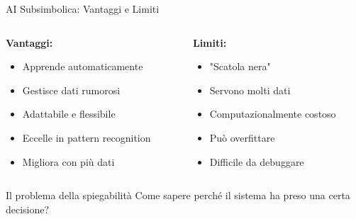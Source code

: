 \documentclass[aspectratio=169,12pt]{beamer}
\begin{document}
%
%
\begin{frame}{AI Subsimbolica: Vantaggi e Limiti}
    \begin{columns}
        \begin{column}{0.5\textwidth}
            \textbf{Vantaggi:}
            \begin{itemize}
                \item Apprende automaticamente
                \item Gestisce dati rumorosi
                \item Adattabile e flessibile
                \item Eccelle in pattern recognition
                \item Migliora con più dati
            \end{itemize}
        \end{column}
        \begin{column}{0.5\textwidth}
            \textbf{Limiti:}
            \begin{itemize}
                \item "Scatola nera"
                \item Servono molti dati
                \item Computazionalmente costoso
                \item Può overfittare
                \item Difficile da debuggare
            \end{itemize}
        \end{column}
    \end{columns}
    
    \vspace{0.5cm}
    
    \begin{alertblock}{Il problema della spiegabilità}
        Come sapere perché il sistema ha preso una certa decisione?
    \end{alertblock}
\end{frame}
%
%
\end{document}
